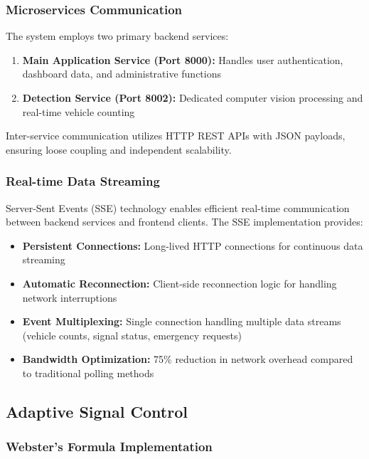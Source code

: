 \documentclass[conference]{IEEEtran}
\begin{document}
\subsubsection{Microservices Communication}

The system employs two primary backend services:

\begin{enumerate}
\item \textbf{Main Application Service (Port 8000):} Handles user authentication, dashboard data, and administrative functions
\item \textbf{Detection Service (Port 8002):} Dedicated computer vision processing and real-time vehicle counting
\end{enumerate}

Inter-service communication utilizes HTTP REST APIs with JSON payloads, ensuring loose coupling and independent scalability.

\subsubsection{Real-time Data Streaming}

Server-Sent Events (SSE) technology enables efficient real-time communication between backend services and frontend clients. The SSE implementation provides:

\begin{itemize}
\item \textbf{Persistent Connections:} Long-lived HTTP connections for continuous data streaming
\item \textbf{Automatic Reconnection:} Client-side reconnection logic for handling network interruptions
\item \textbf{Event Multiplexing:} Single connection handling multiple data streams (vehicle counts, signal status, emergency requests)
\item \textbf{Bandwidth Optimization:} 75\% reduction in network overhead compared to traditional polling methods
\end{itemize}

\subsection{Adaptive Signal Control}

\subsubsection{Webster's Formula Implementation}
\end{document}
